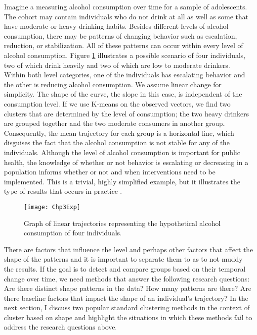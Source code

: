 Imagine a measuring alcohol consumption over time for a sample of adolescents. The cohort may contain individuals who do not drink at all as well as some that have moderate or heavy drinking habits. Besides different levels of alcohol consumption, there may be patterns of changing behavior such as escalation, reduction, or stabilization. All of these patterns can occur within every level of alcohol consumption. Figure \ref{fig:3-1} illustrates a possible scenario of four individuals, two of which drink heavily and two of which are low to moderate drinkers. Within both level categories, one of the individuals has escalating behavior and the other is reducing alcohol consumption. We assume linear change for simplicity. The shape of the curve, the slope in this case, is independent of the consumption level. If we use K-means on the observed vectors, we find two clusters that are determined by the level of consumption; the two heavy drinkers are grouped together and the two moderate consumers in another group. Consequently, the mean trajectory for each group is a horizontal line, which disguises the fact that the alcohol consumption is not stable for any of the individuals. Although the level of alcohol consumption is important for public health, the knowledge of whether or not behavior is escalating or decreasing in a population informs whether or not and when interventions need to be implemented. This is a trivial, highly simplified example, but it illustrates the type of results that occurs in practice \cite{mccoy2010}.

\begin{figure}
\begin{center}
\texttt{[image: Chp3Exp]}
\end{center}
\caption{Graph of linear trajectories representing the hypothetical alcohol consumption of four individuals.}
\label{fig:3-1}
\end{figure}

There are factors that influence the level and perhaps other factors that affect the shape of the patterns and it is important to separate them to as to not muddy the results. If the goal is to detect and compare groups based on their temporal change over time, we need methods that answer the following research questions: Are there distinct shape patterns in the data? How many patterns are there? Are there baseline factors that impact the shape of an individual's trajectory? In the next section, I discuss two popular standard clustering methods in the context of cluster based on shape and highlight the situations in which these methods fail to address the research questions above. 

